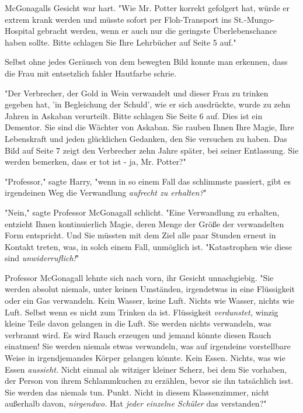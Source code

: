 {McGonagalls Gesicht war hart. "Wie Mr. Potter korrekt gefolgert hat, würde er extrem krank werden und müsste sofort per Floh-Transport ins St.-Mungo-Hospital gebracht werden, wenn er auch nur die geringste Überlebenschance haben sollte. Bitte schlagen Sie Ihre Lehrbücher auf Seite 5 auf."

Selbst ohne jedes Geräusch von dem bewegten Bild konnte man erkennen, dass die Frau mit entsetzlich fahler Hautfarbe schrie.

"Der Verbrecher, der Gold in Wein verwandelt und dieser Frau zu trinken gegeben hat, 'in Begleichung der Schuld', wie er sich ausdrückte, wurde zu zehn Jahren in Askaban verurteilt. Bitte schlagen Sie Seite 6 auf. Dies ist ein Dementor. Sie sind die Wächter von Askaban. Sie rauben Ihnen Ihre Magie, Ihre Lebenskraft und jeden glücklichen Gedanken, den Sie versuchen zu haben. Das Bild auf Seite 7 zeigt den Verbrecher zehn Jahre später, bei seiner Entlassung. Sie werden bemerken, dass er tot ist - ja, Mr. Potter?"

"Professor," sagte Harry, "wenn in so einem Fall das schlimmste passiert, gibt es irgendeinen Weg die Verwandlung \emph{aufrecht zu erhalten?}"

"Nein," sagte Professor McGonagall schlicht. "Eine Verwandlung zu erhalten, entzieht Ihnen kontinuierlich Magie, deren Menge der Größe der verwandelten Form entspricht. Und Sie müssten mit dem Ziel alle paar Stunden erneut in Kontakt treten, was, in solch einem Fall, unmöglich ist. "Katastrophen wie diese sind \emph{unwiderruflich!}"

Professor McGonagall lehnte sich nach vorn, ihr Gesicht unnachgiebig. "Sie werden absolut niemals, unter keinen Umständen, irgendetwas in eine Flüssigkeit oder ein Gas verwandeln. Kein Wasser, keine Luft. Nichts wie Wasser, nichts wie Luft. Selbst wenn es nicht zum Trinken da ist. Flüssigkeit \emph{verdunstet,} winzig kleine Teile davon gelangen in die Luft. Sie werden nichts verwandeln, was verbrannt wird. Es wird Rauch erzeugen und jemand könnte diesen Rauch einatmen! Sie werden niemals etwas verwandeln, was auf irgendeine vorstellbare Weise in irgendjemandes Körper gelangen könnte. Kein Essen. Nichts, was wie Essen \emph{aussieht.} Nicht einmal als witziger kleiner Scherz, bei dem Sie vorhaben, der Person von ihrem Schlammkuchen zu erzählen, bevor sie ihn tatsächlich isst. Sie werden das niemals tun. Punkt. Nicht in diesem Klassenzimmer, nicht außerhalb davon, \emph{nirgendwo.} Hat \emph{jeder einzelne Schüler} das verstanden?"

}

